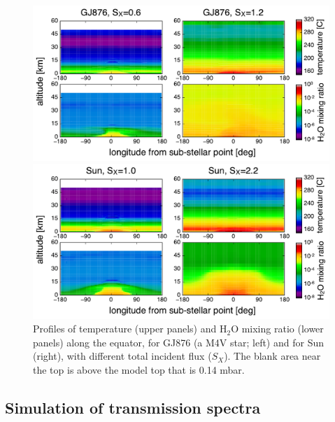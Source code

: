 \documentclass[11pt,numberedappendix,twocolappendix,]{emulateapj}
\def\water{H$_2$O }
\begin{document}
\begin{figure}[tb]
    \begin{minipage}{0.5\hsize}
\includegraphics[width=\hsize]{fig/AqOH0TLS_GJ876_temp_xH2O.pdf}
    \end{minipage}
    \begin{minipage}{0.5\hsize}
\includegraphics[width=\hsize]{fig/AqOH0TLS_Sun_temp_xH2O.pdf}
    \end{minipage}
    \caption{Profiles of temperature (upper panels) and \water mixing ratio (lower panels) along the equator, for GJ876 (a M4V star; left) and for Sun (right), with different total incident flux ($S_X$). The blank area near the top is above the model top that is  0.14 mbar. }
\label{fig:3Dprofile_equator}
\end{figure}


\subsection{Simulation of transmission spectra}
\label{ss:method_TransmissionSpectra}
\end{document}
